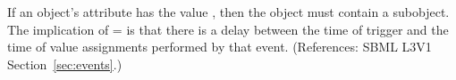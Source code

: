 If an \Event object's  attribute has the
value , then the \Event object must contain a \Delay subobject.
The implication of = is that
there is a delay between the time of trigger and the time of value
assignments performed by that event.  (References: SBML L3V1
Section~\ref{sec:events}.)
